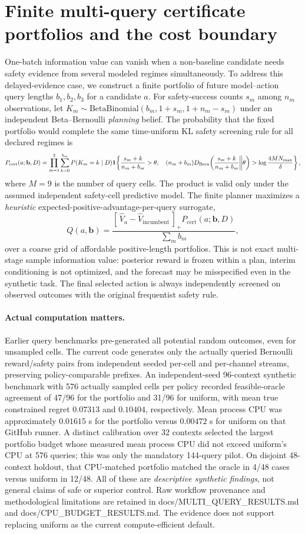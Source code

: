 \documentclass[11pt]{article}
\begin{document}
\section{Finite multi-query certificate portfolios and the cost boundary}
One-batch information value can vanish when a non-baseline candidate needs safety evidence from several modeled regimes simultaneously. To address this delayed-evidence case, we construct a finite portfolio of future model--action query lengths $b_1,b_2,b_3$ for a candidate $a$. For safety-success counts $s_m$ among $n_m$ observations, let $K_m\sim\mathrm{BetaBinomial}(b_m,1+s_m,1+n_m-s_m)$ under an independent Beta--Bernoulli \emph{planning} belief. The probability that the fixed portfolio would complete the same time-uniform KL safety screening rule for all declared regimes is
\[
 P_{\mathrm{cert}}(a;\mathbf b,D)=\prod_{m=1}^{3}
 \sum_{k=0}^{b_m}P(K_m=k\mid D)
 \mathbf{1}\!\left\{\frac{s_m+k}{n_m+b_m}>\theta,\quad
 (n_m+b_m)D_{\rm Bern}\!\left(\frac{s_m+k}{n_m+b_m}\middle\|\theta\right)>
 \log\frac{4M N_{\max}}{\delta}\right\},
\]
where $M=9$ is the number of query cells. The product is valid only under the assumed independent safety-cell predictive model. The finite planner maximizes a \emph{heuristic} expected-positive-advantage-per-query surrogate,
\[
 Q(a,\mathbf b)=
 \frac{[\,\widehat V_a-\widehat V_{\mathrm{incumbent}}\,]_+
 P_{\mathrm{cert}}(a;\mathbf b,D)}{\sum_m b_m},
\]
over a coarse grid of affordable positive-length portfolios. This is not exact multi-stage sample information value: posterior reward is frozen within a plan, interim conditioning is not optimized, and the forecast may be misspecified even in the synthetic task. The final selected action is always independently screened on observed outcomes with the original frequentist safety rule.

\paragraph{Actual computation matters.}
Earlier query benchmarks pre-generated all potential random outcomes, even for unsampled cells. The current code generates only the actually queried Bernoulli reward/safety pairs from independent seeded per-cell and per-channel streams, preserving policy-comparable prefixes. An independent-seed 96-context synthetic benchmark with 576 actually sampled cells per policy recorded feasible-oracle agreement of 47/96 for the portfolio and 31/96 for uniform, with mean true constrained regret $0.07313$ and $0.10404$, respectively. Mean process CPU was approximately $0.01615$ s for the portfolio versus $0.00472$ s for uniform on that GitHub runner. A distinct calibration over 32 contexts selected the largest portfolio budget whose measured mean process CPU did not exceed uniform's CPU at 576 queries; this was only the mandatory 144-query pilot. On disjoint 48-context holdout, that CPU-matched portfolio matched the oracle in 4/48 cases versus uniform in 12/48. All of these are \emph{descriptive synthetic findings}, not general claims of safe or superior control. Raw workflow provenance and methodological limitations are retained in docs/MULTI_QUERY_RESULTS.md and docs/CPU_BUDGET_RESULTS.md. The evidence does not support replacing uniform as the current compute-efficient default.
\end{document}

